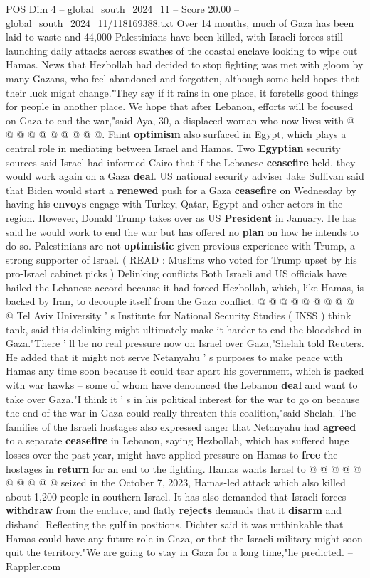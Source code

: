 \begin{textsample}{POS Dim 4 – global\_south\_2024\_11 – Score 20.00 – global\_south\_2024\_11/118169388.txt}
Over 14 months, much of Gaza has been laid to waste and 44,000 Palestinians have been killed, with Israeli forces still launching daily attacks across swathes of the coastal enclave looking to wipe out Hamas.
News that Hezbollah had decided to stop fighting was met with gloom by many Gazans, who feel abandoned and forgotten, although some held hopes that their luck might change."They say if it rains in one place, it foretells good things for people in another place.
We hope that after Lebanon, efforts will be focused on Gaza to end the war,"said Aya, 30, a displaced woman who now lives with @ @ @ @ @ @ @ @ @ @.
Faint \textbf{optimism} also surfaced in Egypt, which plays a central role in mediating between Israel and Hamas.
Two \textbf{Egyptian} security sources said Israel had informed Cairo that if the Lebanese \textbf{ceasefire} held, they would work again on a Gaza \textbf{deal}.
US national security adviser Jake Sullivan said that Biden would start a \textbf{renewed} push for a Gaza \textbf{ceasefire} on Wednesday by having his \textbf{envoys} engage with Turkey, Qatar, Egypt and other actors in the region.
However, Donald Trump takes over as US \textbf{President} in January.
He has said he would work to end the war but has offered no \textbf{plan} on how he intends to do so.
Palestinians are not \textbf{optimistic} given previous experience with Trump, a strong supporter of Israel. ( READ : Muslims who voted for Trump upset by his pro-Israel cabinet picks ) Delinking conflicts Both Israeli and US officials have hailed the Lebanese accord because it had forced Hezbollah, which, like Hamas, is backed by Iran, to decouple itself from the Gaza conflict. @ @ @ @ @ @ @ @ @ @ Tel Aviv University ' s Institute for National Security Studies ( INSS ) think tank, said this delinking might ultimately make it harder to end the bloodshed in Gaza."There ' ll be no real pressure now on Israel over Gaza,"Shelah told Reuters.
He added that it might not serve Netanyahu ' s purposes to make peace with Hamas any time soon because it could tear apart his government, which is packed with war hawks -- some of whom have denounced the Lebanon \textbf{deal} and want to take over Gaza."I think it ' s in his political interest for the war to go on because the end of the war in Gaza could really threaten this coalition,"said Shelah.
The families of the Israeli hostages also expressed anger that Netanyahu had \textbf{agreed} to a separate \textbf{ceasefire} in Lebanon, saying Hezbollah, which has suffered huge losses over the past year, might have applied pressure on Hamas to \textbf{free} the hostages in \textbf{return} for an end to the fighting.
Hamas wants Israel to @ @ @ @ @ @ @ @ @ @ seized in the October 7, 2023, Hamas-led attack which also killed about 1,200 people in southern Israel.
It has also demanded that Israeli forces \textbf{withdraw} from the enclave, and flatly \textbf{rejects} demands that it \textbf{disarm} and disband.
Reflecting the gulf in positions, Dichter said it was unthinkable that Hamas could have any future role in Gaza, or that the Israeli military might soon quit the territory."We are going to stay in Gaza for a long time,"he predicted. -- Rappler.com


\end{textsample}
